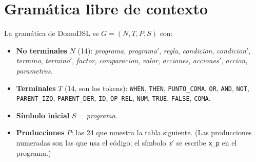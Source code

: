 \section{Gramática libre de contexto}

La gramática de DomoDSL es $G = (N, T, P, S)$ con:
\begin{itemize}[nosep]
\item \textbf{No terminales} $N$ (14): \textit{programa}, \textit{programa}$'$, \textit{regla}, \textit{condicion}, \textit{condicion}$'$, \textit{termino}, \textit{termino}$'$, \textit{factor}, \textit{comparacion}, \textit{valor}, \textit{acciones}, \textit{acciones}$'$, \textit{accion}, \textit{parametros}.
\item \textbf{Terminales} $T$ (14, son los tokens): \texttt{WHEN}, \texttt{THEN}, \texttt{PUNTO\_COMA}, \texttt{OR}, \texttt{AND}, \texttt{NOT}, \texttt{PARENT\_IZQ}, \texttt{PARENT\_DER}, \texttt{ID}, \texttt{OP\_REL}, \texttt{NUM}, \texttt{TRUE}, \texttt{FALSE}, \texttt{COMA}.
\item \textbf{Símbolo inicial} $S$ = \textit{programa}.
\item \textbf{Producciones} $P$: las 24 que muestra la tabla siguiente. (Las producciones numeradas son las que usa el
código; el símbolo \textit{x}$'$ se escribe \texttt{x\_p} en el programa.)
\end{itemize}

